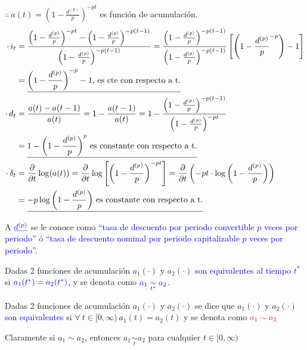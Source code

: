 $\therefore \: a(t) = \left(1 - \frac{d^{(p)}}{p}\right)^{-pt} $ es función de acumulación.
\begin{align*}
\cdot \, i_t &= \frac{\left(1 - \frac{d^{(p)}}{p}\right)^{-pt} - \left(1 - \frac{d^{(p)}}{p}\right)^{-p(t-1)}}{\left(1 - \frac{d^{(p)}}{p}\right)^{-p(t-1)}} = \frac{\left(1 - \frac{d^{(p)}}{p}\right)^{-p(t-1)}}{\left(1 - \frac{d^{(p)}}{p}\right)^{-p(t-1)}} \left[ \left(1 - \frac{d^{(p)}}{p}^{-p}\right) -1\right] \\
&= \uline{\left(1 - \frac{d^{(p)}}{p}\right)^{-p} -1 , \, \text{es cte con respecto a t.}} \\
\cdot \, d_t &= \frac{a(t)-a(t-1)}{a(t)} = 1 - \frac{a(t-1)}{a(t)} = 1- \frac{\left(1 - \frac{d^{(p)}}{p}\right)^{-p(t-1)}}{\left(1 - \frac{d^{(p)}}{p}\right)^{-pt}}\\
&= \uline{1-\left(1 - \frac{d^{(p)}}{p}\right)^{p}\, \text{es constante con respecto a t.}}\\
\cdot \, \delta_t &= \dpartial{t} \log(a(t)) = \dpartial{t}\log\left[\left(1 - \frac{d^{(p)}}{p}\right)^{-pt} \right] = \dpartial{t} \left( -pt\cdot\log\left(1 - \frac{d^{(p)}}{p}\right)\right)\\
&= \uline{-p\log\left(1 - \frac{d^{(p)}}{p}\right) \, \text{es constante con respecto a t.}} 
\end{align*}

A $\textcolor{blue}{\uline{d^{(p)}}}$ se le conoce como \textcolor{blue}{``tasa de descuento por periodo convertible $p$ veces por periodo''} ó \textcolor{blue}{``tasa de descuento nominal por periodo capitalizable $p$ veces por periodo''}.

\begin{definition}[1]
Dadas 2 funciones de acumulación $a_1(\cdot)$ y $a_2(\cdot)$ \textcolor{blue} {son equivalentes al tiempo $t^{*}$} si $\textcolor{blue}{a_1(t^{*})= a_2(t^{*})}$, y se denota como $\textcolor{blue}{a_1 \underset{t^{*}}{\sim }a_2}$.
\end{definition}

\begin{definition}[2]
Dadas 2 funciones de acumulación $a_1(\cdot)$ y $a_2(\cdot)$ se dice que $a_1(\cdot)$ y $a_2(\cdot)$ \textcolor{blue}{son equivalentes} si $\forall \: t\in[0,\infty) \: a_1(t) = a_2(t)$ y se denota como $\textcolor{red}{a_1 \sim a_2}$
\end{definition}

Claramente si $a_1 \sim a_2$, entonces $a_1 \underset{t}{\sim} a_2$ para cualquier $t \in [0, \infty)$       

